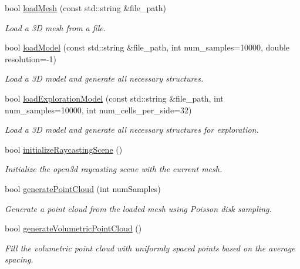 \begin{DoxyCompactItemize}
bool \hyperlink{classvisioncraft_1_1ModelLoader_a61077fd775e05a367f29ec7177c7cb6b}{load\+Mesh} (const std\+::string \&file\+\_\+path)
\begin{DoxyCompactList}\small\item\em Load a 3D mesh from a file. \end{DoxyCompactList}\item 
bool \hyperlink{classvisioncraft_1_1ModelLoader_a6aa945177c6ad62ada1b3eb4b692e5ae}{load\+Model} (const std\+::string \&file\+\_\+path, int num\+\_\+samples=10000, double resolution=-\/1)
\begin{DoxyCompactList}\small\item\em Load a 3D model and generate all necessary structures. \end{DoxyCompactList}\item 
bool \hyperlink{classvisioncraft_1_1ModelLoader_a807ceb7f84c212f019057a621461d7fb}{load\+Exploration\+Model} (const std\+::string \&file\+\_\+path, int num\+\_\+samples=10000, int num\+\_\+cells\+\_\+per\+\_\+side=32)
\begin{DoxyCompactList}\small\item\em Load a 3D model and generate all necessary structures for exploration. \end{DoxyCompactList}\item 
bool \hyperlink{classvisioncraft_1_1ModelLoader_a19e1a6ec780cc1eaee022840e72302e4}{initialize\+Raycasting\+Scene} ()
\begin{DoxyCompactList}\small\item\em Initialize the open3d raycasting scene with the current mesh. \end{DoxyCompactList}\item 
bool \hyperlink{classvisioncraft_1_1ModelLoader_a9ab4c567f98c43ba6b5312525066cb24}{generate\+Point\+Cloud} (int num\+Samples)
\begin{DoxyCompactList}\small\item\em Generate a point cloud from the loaded mesh using Poisson disk sampling. \end{DoxyCompactList}\item 
bool \hyperlink{classvisioncraft_1_1ModelLoader_ac8c840ea98ceb68cedb9d85ef93d7148}{generate\+Volumetric\+Point\+Cloud} ()
\begin{DoxyCompactList}\small\item\em Fill the volumetric point cloud with uniformly spaced points based on the average spacing. \end{DoxyCompactList}\item 

\end{DoxyCompactItemize}
